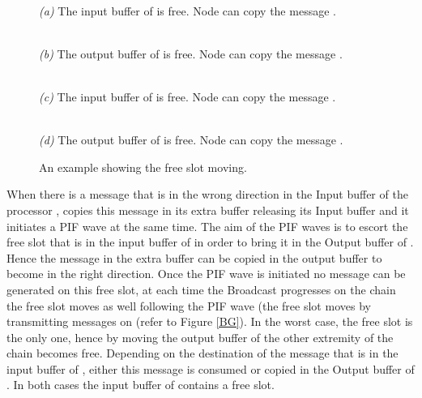 \documentclass{llncs}
\begin{document}
\begin{figure}
 \begin{minipage}[b]{.46\linewidth}
  \begin{center}
  \\
  \textit{(a)} The input buffer of  is free. Node  can copy the message . 
  \end{center}
 \end{minipage} \hfill
 \begin{minipage}[b]{.46\linewidth}
 \begin{center}
 \\
  \textit{(b)} The output buffer of  is free. Node  can copy the message .
  \end{center}
 \end{minipage}\hfill
 \begin{minipage}[b]{.46\linewidth}
\begin{center}  
  \\
  \textit{(c)} The input buffer of  is free. Node  can copy the message .
  \end{center}
 \end{minipage}\hfill
 \begin{minipage}[b]{.46\linewidth}
 \begin{center}
 \\
  \textit{(d)} The output buffer of  is free. Node  can copy the message .
  \end{center}
 \end{minipage}
 \caption{An example showing the free slot moving.\label{EmptySlot}}
\end{figure}

When there is a message that is in the wrong direction in the Input buffer of the processor ,  copies
this message in its extra buffer releasing its Input buffer and it initiates a PIF wave at the same time. The aim of
the PIF waves is to escort the free slot that is in the input buffer of  in order to bring it in the Output
buffer of . Hence the message in the extra buffer can be copied in the output buffer to become in the right
direction. Once the PIF wave is initiated no message can be generated on this free slot, at each time the Broadcast
progresses on the chain the free slot moves as well following the PIF wave (the free slot moves by transmitting
messages on  (refer to Figure \ref{BG}). In the worst case, the free slot is the only one, hence by moving the
output buffer of the other extremity of the chain  becomes free. Depending on the destination of the message that
is in the input buffer of , either this message is consumed or copied in the Output buffer of . In both cases
the input buffer of  contains a free slot.
\end{document}
